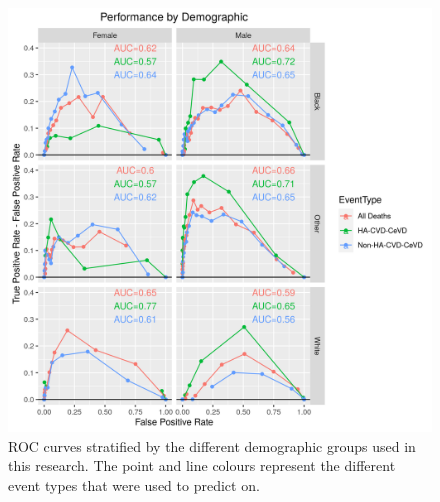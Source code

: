 \documentclass[
]{article}
\begin{document}
\begin{figure}
\centering
\includegraphics{./Rmarkdown_Plots/ROC_CAx-EventType_Demog_10Yr_45-64.png}
\caption{ROC curves stratified by the different demographic groups used in this research. The point and line colours represent the different event types that were used to predict on.}\label{fig:ROC_Demog}
\end{figure}
\end{document}
